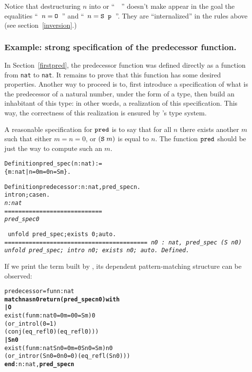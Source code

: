 \documentclass[11pt]{article}
\begin{document}
Notice that destructuring $n$ into  or ``~~''
 doesn't
make appear in the goal the equalities ``~$n=\mbox{\texttt{O}}$~''
 and ``~$n=\mbox{\texttt{S p}}$~''.
They are ``internalized'' in the rules above (see section~\ref{inversion}.)

\subsubsection{Example: strong specification of the predecessor function.}

In Section~\ref{firstpred}, the predecessor function was defined directly
as a function from \texttt{nat} to \texttt{nat}. It remains to prove
that this function has some desired properties. Another way to proceed
is to, first introduce a specification of what is the predecessor of a 
natural number, under the form of a {\coq} type, then build an inhabitant 
of this type: in other words, a realization of this specification. This way, the correctness
of this realization is ensured by {\coq}'s type system.

A reasonable specification for $\texttt{pred}$ is to say that for all $n$
there exists another $m$ such that either $m=n=0$, or $(\texttt{S}\;m)$
is equal to  $n$. The function $\texttt{pred}$ should be just the way to
compute such an $m$. 

\begin{alltt}
Definition pred_spec (n:nat) := 
   \{m:nat | n=0{\coqand} m=0 {\coqor} n = S m\}.
  
Definition  predecessor : {\prodsym} n:nat, pred_spec n.
 intro n; case n.
\it{}  
  n : nat
  ============================
   pred_spec 0

\tt{} unfold pred_spec;exists 0;auto.
\it{}
 =========================================
 {\prodsym} n0 : nat, pred_spec (S n0)
\tt{}
 unfold pred_spec; intro n0; exists n0; auto.
Defined.
\end{alltt}

If we print the term built by {\coq}, its dependent pattern-matching structure can be observed:

\begin{alltt}
predecessor =  fun n : nat {\funarrow}
\textbf{match n as n0 return (pred_spec n0) with}
\textbf{| O {\funarrow}}
    exist (fun m : nat {\funarrow} 0 = 0 {\coqand} m = 0 {\coqor} 0 = S m) 0
      (or_introl (0 = 1) 
                 (conj (eq_refl 0) (eq_refl 0)))
\textbf{| S n0 {\funarrow}}
    exist (fun m : nat {\funarrow} S n0 = 0 {\coqand} m = 0 {\coqor} S n0 = S m) n0
      (or_intror (S n0 = 0 {\coqand} n0 = 0) (eq_refl (S n0)))
\textbf{end}  : {\prodsym} n : nat, \textbf{pred_spec n}
\end{alltt}
\end{document}
